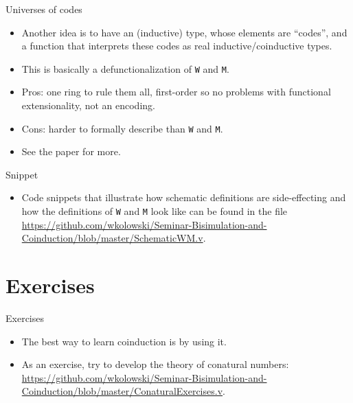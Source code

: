 \documentclass{beamer}
\begin{document}
\begin{frame}{Universes of codes}
\begin{itemize}
	\item Another idea is to have an (inductive) type, whose elements are ``codes'', and a function that interprets these codes as real inductive/coinductive types.
	\item This is basically a defunctionalization of \texttt{W} and \texttt{M}.
	\item Pros: one ring to rule them all, first-order so no problems with functional extensionality, not an encoding.
	\item Cons: harder to formally describe than \texttt{W} and \texttt{M}.
	\item See the paper \href{http://jmchapman.io/papers/levitation.pdf}{\color{blue}{The gentle art of levitation}} for more.
\end{itemize}
\end{frame}

\begin{frame}{Snippet}
\begin{itemize}
	\item Code snippets that illustrate how schematic definitions are side-effecting and how the definitions of \texttt{W} and \texttt{M} look like can be found in the file \url{https://github.com/wkolowski/Seminar-Bisimulation-and-Coinduction/blob/master/SchematicWM.v}.
\end{itemize}
\end{frame}

\section{Exercises}

\begin{frame}{Exercises}
\begin{itemize}
	\item The best way to learn coinduction is by using it.
	\item As an exercise, try to develop the theory of conatural numbers: \url{https://github.com/wkolowski/Seminar-Bisimulation-and-Coinduction/blob/master/ConaturalExercises.v}.
\end{itemize}
\end{frame}
\end{document}
